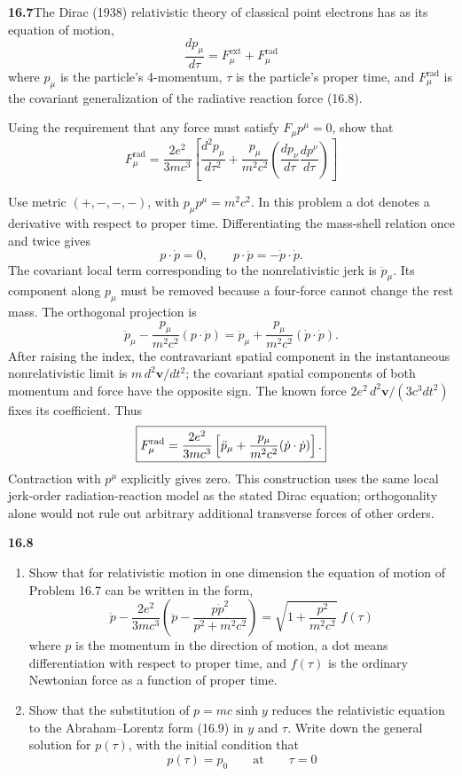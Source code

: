 \par\bigskip
\noindent\textbf{16.7}\quad The Dirac (1938) relativistic theory of classical point electrons has as its equation of motion,
\[
\frac{dp_{\mu}}{d\tau}=F_{\mu}^{\mathrm{ext}}+F_{\mu}^{\mathrm{rad}}
\]
where $p_{\mu}$ is the particle's 4-momentum, $\tau$ is the particle's proper time, and $F_{\mu}^{\mathrm{rad}}$ is the covariant generalization of the radiative reaction force (16.8).

Using the requirement that any force must satisfy $F_{\mu}p^{\mu}=0$, show that
\[
F_{\mu}^{\mathrm{rad}}=\frac{2e^{2}}{3mc^{3}}\left[\frac{d^{2}p_{\mu}}{d\tau^{2}}+\frac{p_{\mu}}{m^{2}c^{2}}\left(\frac{dp_{\nu}}{d\tau}\frac{dp^{\nu}}{d\tau}\right)\right]
\]
\solution

Use metric $(+,-,-,-)$, with $p_\mu p^\mu=m^2c^2$.
In this problem a dot denotes a derivative with respect to proper time.
Differentiating the mass-shell relation once and twice gives
\[
p\cdot\dot p=0,\qquad p\cdot\ddot p=-\dot p\cdot\dot p.
\]
The covariant local term corresponding to the nonrelativistic jerk is
$\ddot p_\mu$. Its component along $p_\mu$ must be removed because a
four-force cannot change the rest mass. The orthogonal projection is
\[
\ddot p_\mu-\frac{p_\mu}{m^2c^2}(p\cdot\ddot p)
=\ddot p_\mu+\frac{p_\mu}{m^2c^2}(\dot p\cdot\dot p).
\]
After raising the index, the contravariant spatial component in the
instantaneous nonrelativistic limit is $m\,d^2\mathbf v/dt^2$;
the covariant spatial components of both momentum and force have the
opposite sign. The known force
$2e^2\,d^2\mathbf v/(3c^3dt^2)$ fixes its coefficient. Thus
\[
\boxed{F_\mu^{\rm rad}=\frac{2e^2}{3mc^3}
\left[\ddot p_\mu+\frac{p_\mu}{m^2c^2}(\dot p\cdot\dot p)\right].}
\]
Contraction with $p^\mu$ explicitly gives zero.
This construction uses the same local jerk-order radiation-reaction
model as the stated Dirac equation; orthogonality alone would not rule
out arbitrary additional transverse forces of other orders.

\par\bigskip
\noindent\textbf{16.8}\quad\begin{enumerate}
\item[(a)] Show that for relativistic motion in one dimension the equation of motion of Problem 16.7 can be written in the form,
\[
\dot{p}-\frac{2e^{2}}{3mc^{3}}\left(\ddot{p}-\frac{p\dot{p}^{2}}{p^{2}+m^{2}c^{2}}\right)=\sqrt{1+\frac{p^{2}}{m^{2}c^{2}}}\;f(\tau)
\]
where $p$ is the momentum in the direction of motion, a dot means differentiation with respect to proper time, and $f(\tau)$ is the ordinary Newtonian force as a function of proper time.
\item[(b)] Show that the substitution of $p=mc\sinh y$ reduces the relativistic equation to the Abraham--Lorentz form (16.9) in $y$ and $\tau$. Write down the general solution for $p(\tau)$, with the initial condition that
\[
p(\tau)=p_{0}\qquad\text{at}\qquad\tau=0
\]
\end{enumerate}
\solution

